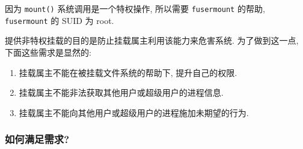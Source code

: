\documentclass[nofonts]{ctexart}
\begin{document}
因为 \texttt{mount()} 系统调用是一个特权操作, 所以需要
\texttt{fusermount} 的帮助, \texttt{fusermount} 的 SUID 为 root.

提供非特权挂载的目的是防止挂载属主利用该能力来危害系统. 为了做到这一点,
下面这些需求是显然的:

\begin{enumerate}
\def\labelenumi{\arabic{enumi}.}
\item
  挂载属主不能在被挂载文件系统的帮助下, 提升自己的权限.
\item
  挂载属主不能非法获取其他用户或超级用户的进程信息.
\item
  挂载属主不能向其他用户或超级用户的进程施加未期望的行为.
\end{enumerate}

\subsubsection{如何满足需求?}\label{ux5982ux4f55ux6ee1ux8db3ux9700ux6c42}
\end{document}

